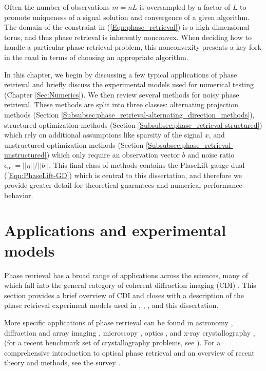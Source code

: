 Often the number of observations $m = nL$ is oversampled by a factor of $L$ to promote uniqueness of a signal solution and convergence of a given algorithm.  The domain of the constraint in (\ref{Eqn:phase_retrieval}) is a high-dimensional torus, and thus phase retrieval is inherently nonconvex.  When deciding how to handle a particular phase retrieval problem, this nonconvexity presents a key fork in the road in terms of choosing an appropriate algorithm.  


In this chapter, we begin by discussing a few typical applications of phase retrieval and briefly discuss the experimental models used for numerical testing (Chapter \ref{Sec:Numerics}).  We then review several methods for noisy phase retrieval.  These methods are split into three classes: alternating projection methods (Section \ref{Subsubsec:phase_retrieval-alternating_direction_methods}), structured optimization methods (Section \ref{Subsubsec:phase_retrieval-structured}) which rely on additional assumptions like sparsity of the signal $x$, and unstructured optimization methods (Section \ref{Subsubsec:phase_retrieval-unstructured}) which only require an observation vector $b$ and noise ratio $\epsilon_{\text{rel}} = ||\eta|| / ||b||$.  This final class of methods contains the PlaseLift gauge dual (\ref{Eqn:PhaseLift-GD}) which is central to this dissertation, and therefore we provide greater detail for theoretical guarantees and numerical performance behavior.





\section{Applications and experimental models} 			\label{Subsec:phase_retrieval-applications}


Phase retrieval has a broad range of applications across the sciences, many of which fall into the general category of coherent diffraction imaging (CDI) \cite{miao1999extending}.  This section provides a brief overview of CDI and closes with a description of the phase retrieval experiment models used in 
\cite{DBLP:journals/siamis/CandesESV13}, \cite{DBLP:journals/tit/CandesLS15}, \cite{DBLP:journals/siamsc/FriedlanderM16}, and this dissertation.


More specific applications of phase retrieval can be found in astronomy \cite{fienup1987phase}, diffraction and array imaging \cite{bunk2007diffractive} \cite{chai2010array}, microscopy \cite{miao2008extending}, optics \cite{walther1963question}, and x-ray crystallography \cite{harrison1993phase}, \cite{millane1990phase} (for a recent benchmark set of crystallography problems, see \cite{elser2017benchmark}).  For a comprehensive introduction to optical phase retrieval and an overview of recent theory and methods, see the survey \cite{DBLP:journals/spm/ShechtmanECCMS15}.


